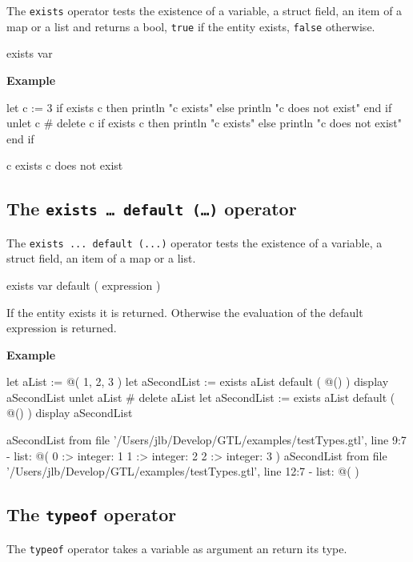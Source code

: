 \documentclass[10pt,openright,twosides]{report}
\newcommand{\gtlinline}[1]{\colorbox{light-blue}{\lstinline[language=gtl]{#1}}}
\newcommand{\example}{\vspace{.75em}\noindent\textbf{Example}\vspace{0em}}
\begin{document}
The \gtlinline{exists} operator tests the existence of a variable, a struct field,  an item of a map or a list and returns a bool, \gtlinline{true} if the entity exists, \gtlinline{false} otherwise.

\begin{gtl}
exists var
\end{gtl}

\example
\begin{gtl}
let c := 3
if exists c then println "c exists" else println "c does not exist" end if
unlet c # delete c
if exists c then println "c exists" else println "c does not exist" end if
\end{gtl}
\begin{console}
c exists
c does not exist
\end{console}

\subsection{The \texttt{exists \ldots{} default (\ldots)} operator}

The \gtlinline{exists ... default (...)} operator tests the existence of a variable, a struct field,  an item of a map or a list.

\begin{gtl}
exists var default ( expression )
\end{gtl}

If the entity exists it is returned. Otherwise the evaluation of the default expression is returned.

\example
\begin{gtl}
let aList := @( 1, 2, 3 )
let aSecondList := exists aList default ( @() )
display aSecondList
unlet aList # delete aList
let aSecondList := exists aList default ( @() )
display aSecondList
\end{gtl}
\begin{console}
aSecondList from file '/Users/jlb/Develop/GTL/examples/testTypes.gtl', line 9:7
  - list: @(
    0 :>
        integer: 1
    1 :>
        integer: 2
    2 :>
        integer: 3
)
aSecondList from file '/Users/jlb/Develop/GTL/examples/testTypes.gtl', line 12:7
  - list: @(
)
\end{console}

\subsection{The \texttt{typeof} operator}

The \gtlinline{typeof} operator takes a variable as argument an return its type.
\end{document}
